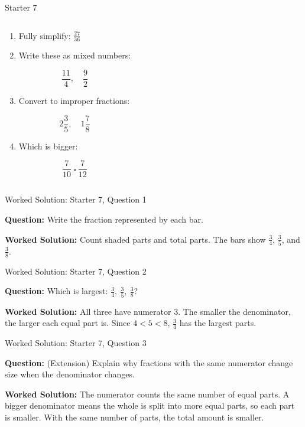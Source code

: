 \documentclass{beamer}
\newcommand{\ashow}[1]{\uncover<2->{\textcolor{red}{\small #1}}}
\begin{document}
\begin{frame}{Starter 7}
\begin{columns}
\begin{multicols}{2}
\begin{enumerate}
\columnbreak

\item Fully simplify: $
\frac{27}{36}
$ \ashow{$\frac{3}{4}$}

\item Write these as mixed numbers:

\[
\frac{11}{4},\quad \frac{9}{2}
\]
\ashow{$2\frac{3}{4},\ 4\frac{1}{2}$}

\item Convert to improper fractions:

\[
2\frac{3}{5},\quad 1\frac{7}{8}
\]
\ashow{$\frac{13}{5},\ \frac{15}{8}$}

\item Which is bigger:

\[
\frac{7}{10}\ \square\ \frac{7}{12}
\]
\ashow{$\frac{7}{10}$}

\end{enumerate}

\end{multicols}

\end{columns}

\end{frame}

\begin{frame}{Worked Solution: Starter 7, Question 1}
\hypertarget{work-st7}{}

\textbf{Question:} Write the fraction represented by each bar.

\textbf{Worked Solution:} Count shaded parts and total parts. The bars show $\frac34$, $\frac35$, and $\frac38$. \ashow{$\frac34,\ \frac35,\ \frac38$.}
\end{frame}

\begin{frame}{Worked Solution: Starter 7, Question 2}

\textbf{Question:} Which is largest: $\frac{3}{4},\ \frac{3}{5},\ \frac{3}{8}$?

\textbf{Worked Solution:} All three have numerator 3. The smaller the denominator, the larger each equal part is. Since $4<5<8$, $\frac34$ has the largest parts. \ashow{$\frac34$ is largest.}
\end{frame}

\begin{frame}{Worked Solution: Starter 7, Question 3}

\textbf{Question:} (Extension) Explain why fractions with the same numerator change size when the denominator changes.

\textbf{Worked Solution:} The numerator counts the same number of equal parts. A bigger denominator means the whole is split into more equal parts, so each part is smaller. With the same number of parts, the total amount is smaller. \ashow{The larger the denominator, the smaller each equal part is, so the fraction is smaller.}
\end{frame}
\end{document}
